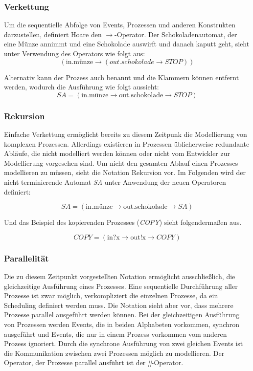 \subsubsection{Verkettung}
Um die sequentielle Abfolge von Events, Prozessen und anderen Konstrukten darzustellen, definiert Hoare den 
$ \rightarrow $-Operator. Der Schokoladenautomat, der eine Münze annimmt und eine Schokolade auswirft und danach kaputt geht, sieht unter Verwendung des Operators wie folgt aus:
\[(\text{in.münze} \rightarrow (out.schokolade \rightarrow STOP))\]

Alternativ kann der Prozess auch benannt und die Klammern können entfernt werden, wodurch die Ausführung wie folgt aussieht: 
\[SA = (\text{in.münze} \rightarrow \text{out.schokolade} \rightarrow STOP)\]

\subsubsection{Rekursion}
Einfache Verkettung ermöglicht bereits zu diesem Zeitpunk die Modellierung von komplexen Prozessen. Allerdings existieren in Prozessen üblicherweise redundante Abläufe, die nicht modelliert werden können oder nicht vom Entwickler zur Modellierung vorgesehen sind. Um nicht den gesamten Ablauf einen Prozesses modellieren zu müssen, sieht die Notation Rekursion vor. 
Im Folgenden wird der nicht terminierende Automat \textit{SA} unter Anwendung der neuen Operatoren definiert:

\[SA = (\text{in.münze} \rightarrow \text{out.schokolade} \rightarrow SA)\]

Und das Beispiel des kopierenden Prozesses (\textit{COPY}) sieht folgendermaßen aus.

\[COPY = (\text{in?x} \rightarrow \text{out!x} \rightarrow COPY)\]

\subsubsection{Parallelität}
Die zu diesem Zeitpunkt vorgestellten Notation ermöglicht ausschließlich, die gleichzeitige Ausführung eines Prozesses. Eine sequentielle Durchführung aller Prozesse ist zwar möglich, verkompliziert die einzelnen Prozesse, da ein Scheduling definiert werden muss. Die Notation sieht aber vor, dass mehrere Prozesse parallel ausgeführt werden können. Bei der gleichzeitigen Ausführung von Prozessen werden Events, die in beiden Alphabeten vorkommen, synchron ausgeführt und Events, die nur in einem Prozess vorkommen vom anderen Prozess ignoriert. Durch die synchrone Ausführung von zwei gleichen Events ist die Kommunikation zwischen zwei Prozessen möglich zu modellieren. Der Operator, der Prozesse parallel ausführt ist der \textit{||}-Operator. 

